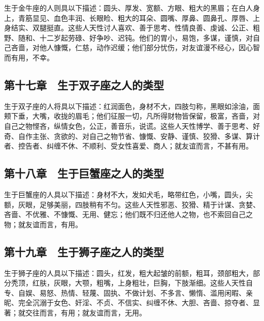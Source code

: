 生于金牛座的人则具以下描述：圆头、厚发、宽额、方眼、粗大的黑眉；在白人身上，青筋显见、血色丰润、长眼睑、粗大的耳朵、圆嘴、厚鼻、圆鼻孔、厚唇、上身结实、双腿挺直。这些人天性讨人喜欢、善于思考、性情良善、虔诚、公正、粗野、随和、十二岁起劳碌、好争吵、迟钝。他们的胃小，易饱，多谋，谨慎，对自己吝啬，对他人慷慨，仁慈，动作迟缓；他们部分忧伤，对友谊漫不经心，因心智而有用，不幸。\par


\subsection{第十七章　生于双子座之人的类型}

生于双子座的人将具以下描述：红润面色，身材不大，四肢匀称，黑眼如涂油，面颊下垂，大嘴，收拢的眉毛；他们征服一切，凡所得财物皆保留，极富，吝啬，对自己之物悭吝，纵情女色，公正，善音乐，说谎。这些人天性博学、善于思考、好奇、自作主张、贪欲的、对自己之物节省、慷慨、安静、谨慎、狡猾、多谋、算计者、控告者、纠缠不休、不顺利、受女性喜爱、商人；就友谊而言，不甚有用。\par


\subsection{第十八章　生于巨蟹座之人的类型}

生于巨蟹座的人具以下描述：身材不大，发如犬毛，略带红色，小嘴，圆头，尖额，灰眼，足够美丽，四肢稍有不匀。这些人天性邪恶、狡猾、精于计谋、贪婪、吝啬、不优雅、不慷慨、无用、健忘；他们既不归还他人之物，也不索回自己之物；就友谊而言，有用。\par


\subsection{第十九章　生于狮子座之人的类型}

生于狮子座的人具以下描述：圆头，红发，粗大起皱的前额，粗耳，颈部粗大，部分秃顶，红肤，灰眼，大颚，粗嘴，上身粗壮，巨胸，下肢渐细。这些人天性自专、自娱、易怒、热情、轻蔑、固执、不做计划、不多言、懒惰、滥用闲暇、亲昵、完全沉溺于女色、奸淫、不贞、不信实、纠缠不休、大胆、吝啬、掠夺者、显著；就交往而言，有用；就友谊而言，无用。\par

